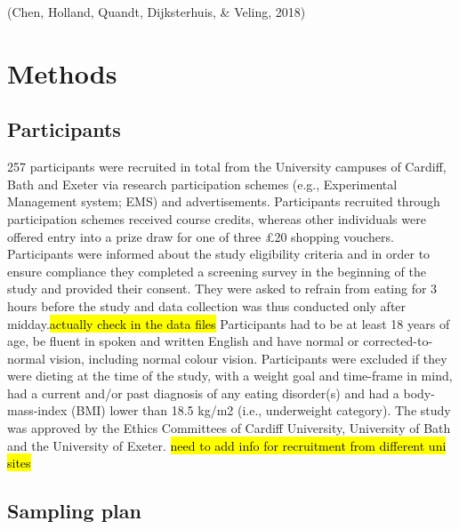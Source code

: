 \documentclass[man,floatsintext]{apa6}
\begin{document}
(Chen, Holland, Quandt, Dijksterhuis, \& Veling, 2018)

\hypertarget{methods}{%
\section{Methods}\label{methods}}

\hypertarget{participants}{%
\subsection{Participants}\label{participants}}

\par

257 participants were recruited in total from the University campuses of Cardiff, Bath and Exeter via research participation schemes (e.g., Experimental Management system; EMS) and advertisements. Participants recruited through participation schemes received course credits, whereas other individuals were offered entry into a prize draw for one of three £20 shopping vouchers. Participants were informed about the study eligibility criteria and in order to ensure compliance they completed a screening survey in the beginning of the study and provided their consent. They were asked to refrain from eating for 3 hours before the study and data collection was thus conducted only after midday.\hl{actually check in the data files} Participants had to be at least 18 years of age, be fluent in spoken and written English and have normal or corrected-to-normal vision, including normal colour vision. Participants were excluded if they were dieting at the time of the study, with a weight goal and time-frame in mind, had a current and/or past diagnosis of any eating disorder(s) and had a body-mass-index (BMI) lower than 18.5 kg/m2 (i.e., underweight category). The study was approved by the Ethics Committees of Cardiff University, University of Bath and the University of Exeter.
\hl{need to add info for recruitment from different uni sites}

\hypertarget{sampling}{%
\subsection{Sampling plan}\label{sampling}}

\par
\end{document}

